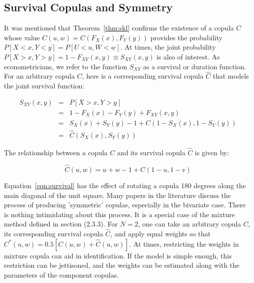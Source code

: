 \documentclass[12pt]{article}
\begin{document}
\subsection{Survival Copulas and Symmetry}

It was mentioned that Theorem~\ref{thm:skl} confirms the existence of a copula $C$ whose value $C\left(u,w\right) = C\left(F_{X}\left(x\right), F_{Y}\left(y\right)\right)$ provides the probability $P\left[X < x, Y < y\right] = P\left[U < u, W < w\right]$. At times, the joint probability $P\left[X > x, Y > y\right] = 1-F_{XY}\left(x,y\right)\equiv S_{XY}\left(x,y\right)$ is also of interest. As econometricians, we refer to the function $S_{XY}$ as a survival or duration function. For an arbitrary copula $C$, here is a corresponding survival copula $\hat{C}$ that models the joint survival function:

\begin{eqnarray*}
S_{XY}\left(x,y\right) &=& P\left[X > x, Y > y\right] \\
						&=& 1-F_{X}\left(x\right) - F_{Y}\left(y\right) + F_{XY}\left(x,y\right) \\
						&=& S_{X}\left(x\right) + S_{Y}\left(y\right) - 1 + C\left(1 - S_{X}\left(x\right), 1 - S_{Y}\left(y\right)\right) \\
						&=& \hat{C}\left(S_{X}\left(x\right), S_{Y}\left(y\right)\right)
\end{eqnarray*}

The relationship between a copula $C$ and its survival copula $\hat{C}$ is given by:

\begin{equation} \label{eqn:survival}
	\hat{C}\left( u,w\right) =u+w-1+C\left( 1-u,1-v\right)
\end{equation}

Equation~\ref{eqn:survival} has the effect of rotating a copula 180 degrees along the main diagonal of the unit square. Many papers in the literature discuss the process of producing 'symmetric' copulas, especially in the bivariate case. There is nothing intimidating about this process. It is a special case of the mixture method defined in section (2.3.3). For $N=2$, one can take an arbitrary copula $C$, its corresponding survival copula $\hat{C}$, and apply equal weights so that $C^{\ast}\left(u,w\right) = 0.5\left[ C\left(u,w\right) +\hat{C}\left(u,w\right)\right]$. At times, restricting the weights in mixture copula can aid in identification. If the model is simple enough, this restriction can be jettisoned, and the weights can be estimated along with the parameters of the component copulas.
\end{document}
